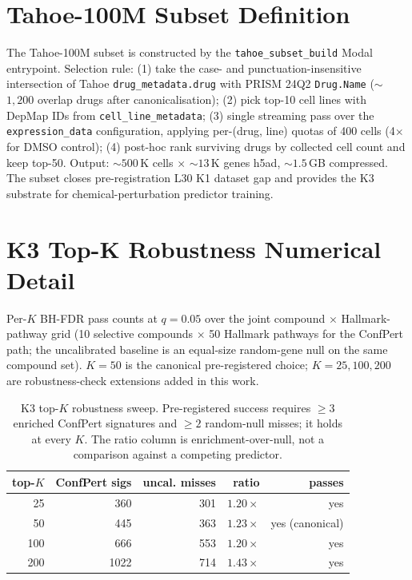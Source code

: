 \documentclass{article}
\begin{document}
\section{Tahoe-100M Subset Definition}
\label{app:tahoe}

The Tahoe-100M subset is constructed by the \texttt{tahoe\_subset\_build} Modal entrypoint. Selection rule: (1) take the case- and punctuation-insensitive intersection of Tahoe \texttt{drug\_metadata.drug} with PRISM 24Q2 \texttt{Drug.Name} ($\sim$$1{,}200$ overlap drugs after canonicalisation); (2) pick top-10 cell lines with DepMap IDs from \texttt{cell\_line\_metadata}; (3) single streaming pass over the \texttt{expression\_data} configuration, applying per-(drug, line) quotas of 400 cells (4$\times$ for DMSO control); (4) post-hoc rank surviving drugs by collected cell count and keep top-50. Output: ${\sim}500$\,K cells $\times$ ${\sim}13$\,K genes h5ad, ${\sim}1.5$\,GB compressed. The subset closes pre-registration L30 K1 dataset gap and provides the K3 substrate for chemical-perturbation predictor training.

\section{K3 Top-K Robustness Numerical Detail}
\label{app:k3}

Per-$K$ BH-FDR pass counts at $q = 0.05$ over the joint compound $\times$ Hallmark-pathway grid (10 selective compounds $\times$ 50 Hallmark pathways for the ConfPert path; the uncalibrated baseline is an equal-size random-gene null on the same compound set). $K=50$ is the canonical pre-registered choice; $K=25, 100, 200$ are robustness-check extensions added in this work.

\begin{table}[h]
\caption{K3 top-$K$ robustness sweep. Pre-registered success requires $\geq 3$ enriched ConfPert signatures and $\geq 2$ random-null misses; it holds at every $K$. The ratio column is enrichment-over-null, not a comparison against a competing predictor.}
\label{tab:k3}
\centering
\begin{tabular}{rrrrr}
\toprule
top-$K$ & ConfPert sigs & uncal. misses & ratio & passes \\
\midrule
25  & 360  & 301 & $1.20\times$ & yes \\
50  & 445  & 363 & $1.23\times$ & yes (canonical) \\
100 & 666  & 553 & $1.20\times$ & yes \\
200 & 1022 & 714 & $1.43\times$ & yes \\
\bottomrule
\end{tabular}
\end{table}
\end{document}
